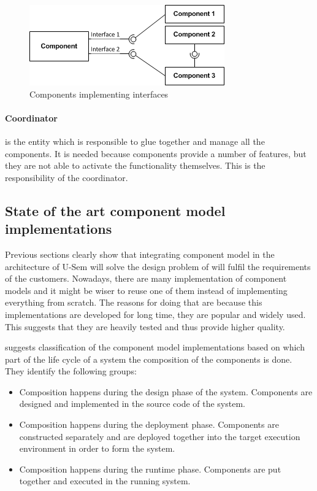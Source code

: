 	\begin{figure}[h!]
  		\centering
  		\includegraphics[scale=0.75]{plug-in/component-services.png}
  		\caption{Components implementing interfaces }
	\end{figure}

\paragraph{Coordinator}
	is the entity which is responsible to glue together and manage all the components. It is needed because components provide a number of features, but they are not able to activate the functionality themselves. This is the responsibility of the coordinator.

\subsection{State of the art component model implementations}

Previous sections clearly show that integrating component model in the architecture of U-Sem will solve the design problem of will fulfil the requirements of the customers. Nowadays, there are many implementation of component models and it might be wiser to reuse one of them instead of implementing everything from scratch. The reasons for doing that are because this implementations are developed for long time, they are popular and widely used. This suggests that they are heavily tested and thus provide higher quality. 

\cite{Lau} suggests classification of the component model implementations based on which part of the life cycle of a system the composition of the components is done. They identify the following groups:

\begin{itemize}
	\item  Composition happens during the design phase of the system. Components are designed and implemented in the source code of the system.
	\item  Composition happens during the deployment phase. Components are constructed separately and are deployed together into the target execution environment in order to form the system.
	\item Composition happens during the runtime phase. Components are put together and executed in the running system.
\end{itemize}

